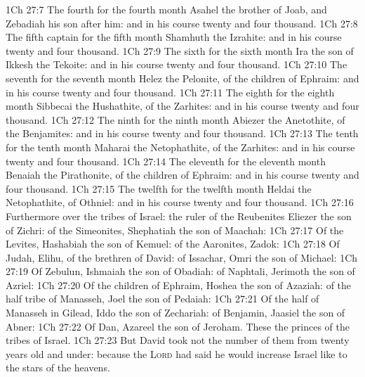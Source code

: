 \vs 1Ch 27:7 The fourth  for the fourth month  Asahel the brother of Joab, and Zebadiah his son after him: and in his course  twenty and four thousand.
\vs 1Ch 27:8 The fifth captain for the fifth month  Shamhuth the Izrahite: and in his course  twenty and four thousand.
\vs 1Ch 27:9 The sixth  for the sixth month  Ira the son of Ikkesh the Tekoite: and in his course  twenty and four thousand.
\vs 1Ch 27:10 The seventh  for the seventh month  Helez the Pelonite, of the children of Ephraim: and in his course  twenty and four thousand.
\vs 1Ch 27:11 The eighth  for the eighth month  Sibbecai the Hushathite, of the Zarhites: and in his course  twenty and four thousand.
\vs 1Ch 27:12 The ninth  for the ninth month  Abiezer the Anetothite, of the Benjamites: and in his course  twenty and four thousand.
\vs 1Ch 27:13 The tenth  for the tenth month  Maharai the Netophathite, of the Zarhites: and in his course  twenty and four thousand.
\vs 1Ch 27:14 The eleventh  for the eleventh month  Benaiah the Pirathonite, of the children of Ephraim: and in his course  twenty and four thousand.
\vs 1Ch 27:15 The twelfth  for the twelfth month  Heldai the Netophathite, of Othniel: and in his course  twenty and four thousand.
\vs 1Ch 27:16 Furthermore over the tribes of Israel: the ruler of the Reubenites  Eliezer the son of Zichri: of the Simeonites, Shephatiah the son of Maachah:
\vs 1Ch 27:17 Of the Levites, Hashabiah the son of Kemuel: of the Aaronites, Zadok:
\vs 1Ch 27:18 Of Judah, Elihu,  of the brethren of David: of Issachar, Omri the son of Michael:
\vs 1Ch 27:19 Of Zebulun, Ishmaiah the son of Obadiah: of Naphtali, Jerimoth the son of Azriel:
\vs 1Ch 27:20 Of the children of Ephraim, Hoshea the son of Azaziah: of the half tribe of Manasseh, Joel the son of Pedaiah:
\vs 1Ch 27:21 Of the half  of Manasseh in Gilead, Iddo the son of Zechariah: of Benjamin, Jaasiel the son of Abner:
\vs 1Ch 27:22 Of Dan, Azareel the son of Jeroham. These  the princes of the tribes of Israel.
\vs 1Ch 27:23 But David took not the number of them from twenty years old and under: because the \textsc{Lord} had said he would increase Israel like to the stars of the heavens.

